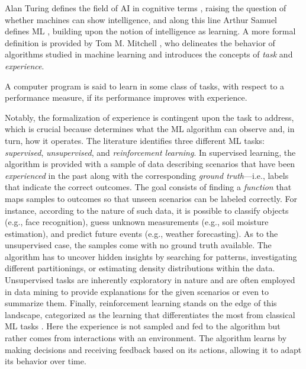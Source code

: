 \documentclass[a4paper,12pt,times,numbered,print,index]{Classes/PhDThesisPSnPDF}
\begin{document}
Alan Turing defines the field of AI in cognitive terms \cite{turing1980computing}, raising the question of whether machines can show intelligence, and along this line Arthur Samuel defines ML \cite{samuel2000some}, building upon the notion of intelligence as learning.
A more formal definition is provided by Tom M. Mitchell \citep{mitchell1997machine}, who delineates the behavior of algorithms studied in machine learning and introduces the concepts of \textit{task} and \textit{experience}.
\begin{definition}
    A computer program is said to learn in some class of tasks, with respect to a performance measure, if its performance improves with experience.
\end{definition}
Notably, the formalization of experience is contingent upon the task to address, which is crucial because determines what the ML algorithm can observe and, in turn, how it operates.
The literature identifies three different ML tasks: \textit{supervised}, \textit{unsupervised}, and \textit{reinforcement learning}.
In supervised learning, the algorithm is provided with a sample of data describing scenarios that have been \textit{experienced} in the past along with the corresponding \textit{ground truth}---i.e., labels that indicate the correct outcomes.
The goal consists of finding a \textit{function} that maps samples to outcomes so that unseen scenarios can be labeled correctly.
For instance, according to the nature of such data, it is possible to classify objects (e.g., face recognition), guess unknown measurements (e.g., soil moisture estimation), and predict future events (e.g., weather forecasting).
As to the unsupervised case, the samples come with no ground truth available.
The algorithm has to uncover hidden insights by searching for patterns, investigating different partitionings, or estimating density distributions within the data.
Unsupervised tasks are inherently exploratory in nature and are often employed in data mining to provide explanations for the given scenarios or even to summarize them.
Finally, reinforcement learning stands on the edge of this landscape, categorized as the learning that differentiates the most from classical ML tasks \cite{sutton2018reinforcement}.
Here the experience is not sampled and fed to the algorithm but rather comes from interactions with an environment.
The algorithm learns by making decisions and receiving feedback based on its actions, allowing it to adapt its behavior over time.
\end{document}
